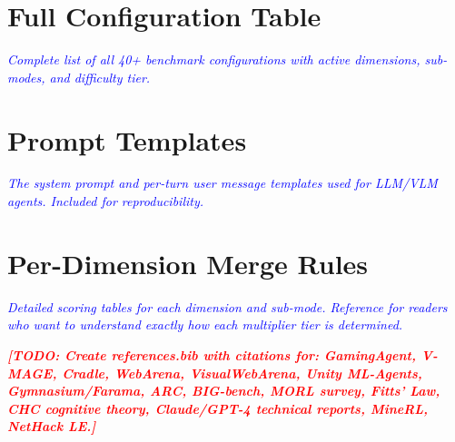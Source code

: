 \documentclass[11pt]{article}
\newcommand{\todo}[1]{\textcolor{red}{\textbf{[TODO: #1]}}}
\newcommand{\plan}[1]{\textcolor{blue}{\textit{#1}}}
\begin{document}
\appendix

\section{Full Configuration Table}
\plan{%
  Complete list of all 40+ benchmark configurations with active dimensions,
  sub-modes, and difficulty tier.
}

\section{Prompt Templates}
\plan{%
  The system prompt and per-turn user message templates used for LLM/VLM
  agents. Included for reproducibility.
}

\section{Per-Dimension Merge Rules}
\plan{%
  Detailed scoring tables for each dimension and sub-mode. Reference for
  readers who want to understand exactly how each multiplier tier is
  determined.
}




\plan{%
  \todo{Create references.bib with citations for:
    GamingAgent, V-MAGE, Cradle, WebArena, VisualWebArena,
    Unity ML-Agents, Gymnasium/Farama, ARC, BIG-bench,
    MORL survey, Fitts' Law, CHC cognitive theory,
    Claude/GPT-4 technical reports, MineRL, NetHack LE.}
}
\end{document}
